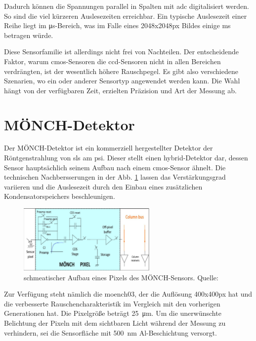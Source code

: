 \noindent
Dadurch können die Spannungen parallel in Spalten mit \gls{adc} digitalisiert werden. So sind die viel kürzeren Auslesezeiten erreichbar. Ein typische Auslesezeit einer Reihe liegt im \si{\micro\second}-Bereich, was im Falle eines 2048x2048px Bildes einige \si{\milli\second} betragen würde.

\noindent
Diese Sensorfamilie ist allerdings nicht frei von Nachteilen. Der entscheidende Faktor, warum \gls{cmos}-Sensoren die \gls{ccd}-Sensoren nicht in allen Bereichen verdrängten, ist der wesentlich höhere Rauschpegel. Es gibt also verschiedene Szenarien, wo ein oder anderer Sensortyp angewendet werden kann. Die Wahl hängt von der verfügbaren Zeit, erzielten Präzision und Art der Messung ab.

\section{MÖNCH-Detektor}
\label{text:moench_theorie}
Der MÖNCH-Detektor ist ein kommerziell hergestellter Detektor der Röntgenstrahlung von \gls{sls} am \gls{psi}. Dieser stellt einen hybrid-Detektor dar, dessen Sensor hauptsächlich seinem Aufbau nach einem \gls{cmos}-Sensor ähnelt. Die technischen Nachbersserungen in der Abb. \ref{fig:moench_pixel} lassen das Verstärkungsgrad variieren und die Auslesezeit durch den Einbau eines zusätzlichen Kondensatorspeichers beschleunigen.
\begin{figure}[H]
    \centering
    \includegraphics[width=0.6\textwidth]{images/moench/paper_crop.png}
    \caption{schmeatischer Aufbau eines Pixels des MÖNCH-Sensors. Quelle: \cite{dinapoli_monch_2014}}
    \label{fig:moench_pixel}
\end{figure}

\noindent
Zur Verfügung steht nämlich die \gls{moench03}, der die Auflösung 400x400px hat und die verbesserte Rauschencharakteristik im Vergleich mit den vorherigen Generationen hat. Die Pixelgröße beträgt \SI{25}{\micro\meter}. Um die unerwünschte Belichtung der Pixeln mit dem sichtbaren Licht während der Messung zu verhindern, sei die Sensorfläche mit \SI{500}{\nano\meter} Al-Beschichtung versorgt.

